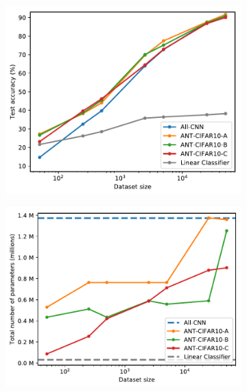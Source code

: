 \begin{figure}[t!]
	\centering
	\begin{subfigure}[t]{0.48\linewidth}
		\caption{}
		\includegraphics[width=\linewidth]{chapter_7/figures/fig_1_2.pdf}
	\end{subfigure}
	\hspace{0mm}
	\begin{subfigure}[t]{0.50\linewidth}
		\caption{}
		\includegraphics[width=\linewidth]{chapter_7/figures/fig_2_2.pdf}
	\end{subfigure}
	\hspace{0mm}
	\begin{subfigure}[t]{0.52\linewidth}

\end{subfigure}
\end{figure}
